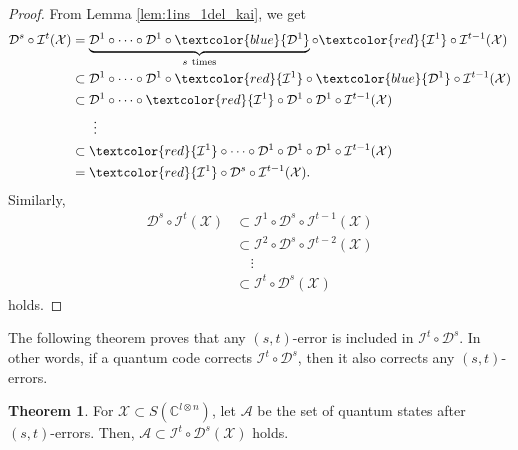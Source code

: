 \documentclass[reprint,amsmath,amssymb,aps,]{revtex4-2}
\theoremstyle{definition}
\newtheorem{theo}{Theorem}
\newcommand{\R}[1]{\textcolor{red}{#1}}
\newcommand{\B}[1]{\textcolor{blue}{#1}}
\newcommand{\SET}[1]{\mathbb{#1}}
\newcommand{\C}{\SET{C}}
\newcommand{\1}{\mbox{1}\hspace{-0.25em}\mbox{l}}%
\newcommand{\pure}[2]{\C^{#1 \otimes #2}}
\newcommand{\state}[2]{S(\pure{#1}{#2})}
\newcommand{\QU}[1]{\mathcal{#1}}
\begin{document}
\begin{proof}
  From Lemma \ref{lem:1ins_1del_kai},
  we get
  \begin{align*}
    \QU{D}^{s} \circ \QU{I}^{t}(\QU{X})
    &=
    \underbrace{
      \QU{D}^{1} \circ \cdots \circ \QU{D}^{1} \circ \B{\QU{D}^{1}}
    }_{s~\text{times}}
    \circ 
    \R{\QU{I}^{1}} \circ \QU{I}^{t-1} 
    (\QU{X})\\
    &\subset
    \QU{D}^{1} \circ \cdots \circ \QU{D}^{1} \circ \R{\QU{I}^{1}}
    \circ 
    \B{\QU{D}^{1}} \circ \QU{I}^{t-1} 
    (\QU{X})\\
    &\subset
    \QU{D}^{1} \circ \cdots \circ \R{\QU{I}^{1}} \circ \QU{D}^{1}
    \circ 
    \QU{D}^{1} \circ \QU{I}^{t-1} 
    (\QU{X})\\
    &~~~~~\vdots\\
    &\subset
    \R{\QU{I}^{1}} \circ \cdots \circ \QU{D}^{1} \circ \QU{D}^{1} \circ \QU{D}^{1}
    \circ 
    \QU{I}^{t-1} 
    (\QU{X})\\
    &=
    \R{\QU{I}^{1}} \circ \QU{D}^{s}
    \circ 
    \QU{I}^{t-1} 
    (\QU{X}).
  \end{align*}
  Similarly,
  \begin{align*}
    \QU{D}^{s} \circ \QU{I}^{t}(\QU{X})
    &\subset
    \QU{I}^{1} \circ \QU{D}^{s} \circ \QU{I}^{t-1} 
    (\QU{X})\\
    &\subset
    \QU{I}^{2} \circ \QU{D}^{s} \circ \QU{I}^{t-2}
    (\QU{X})\\
    &~~~~~\vdots\\
    &\subset
    \QU{I}^{t} \circ \QU{D}^{s}(\QU{X})
  \end{align*}
  holds.
\end{proof}

The following theorem
proves that any $(s,t)$-error is included in $\QU{I}^t \circ \QU{D}^s$.
In other words,
if a quantum code corrects $\QU{I}^t \circ \QU{D}^s$,
then it also corrects any $(s,t)$-errors.

\begin{theo}
  \label{theo:insdel_sphere}
  For $\QU{X} \subset \state{l}{n}$,
  let $\QU{A}$ be
  the set of quantum states after $(s,t)$-errors.
  Then,
  $\QU{A} \subset \QU{I}^t \circ \QU{D}^s(\QU{X})$ holds.
\end{theo}
\end{document}
